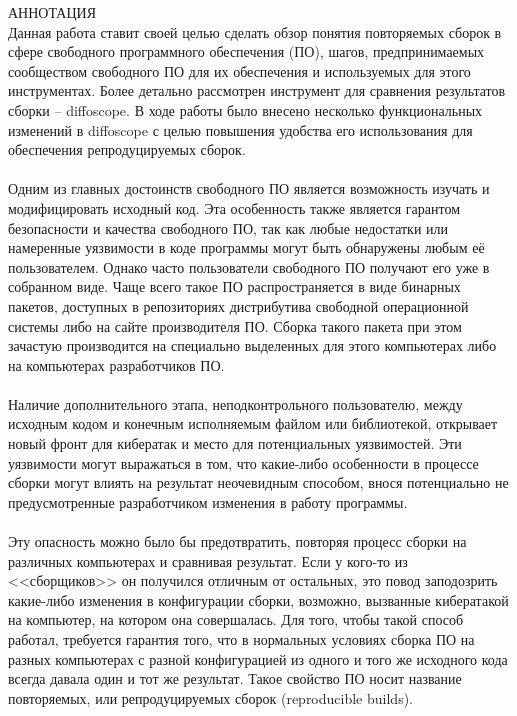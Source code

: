 {\centering
%
\SuperFont\MakeTextUppercase{Аннотация}\\
}
\vspace{32pt}
Данная работа ставит своей целью сделать обзор понятия повторяемых сборок в сфере свободного программного обеспечения (ПО), шагов, предпринимаемых сообществом свободного ПО для их обеспечения и используемых для этого инструментах. Более детально рассмотрен инструмент для сравнения результатов сборки -- diffoscope. В ходе работы было внесено несколько функциональных изменений в diffoscope с целью повышения удобства его использования для обеспечения репродуцируемых сборок.\\\\
Одним из главных достоинств свободного ПО является возможность изучать и модифицировать исходный код. Эта особенность также является гарантом безопасности и качества свободного ПО, так как любые недостатки или намеренные уязвимости в коде программы могут быть обнаружены любым её пользователем. Однако часто пользователи свободного ПО получают его уже в собранном виде. Чаще всего такое ПО распространяется в виде бинарных пакетов, доступных в репозиториях дистрибутива свободной операционной системы либо на сайте производителя ПО. Сборка такого пакета при этом зачастую производится на специально выделенных для этого компьютерах либо на компьютерах разработчиков ПО.\\\\
Наличие дополнительного этапа, неподконтрольного пользователю, между исходным кодом и конечным исполняемым файлом или библиотекой, открывает новый фронт для кибератак и место для потенциальных уязвимостей. Эти уязвимости могут выражаться в том, что какие-либо особенности в процессе сборки могут влиять на результат неочевидным способом, внося потенциально не предусмотренные разработчиком изменения в работу программы.\\\\
Эту опасность можно было бы предотвратить, повторяя процесс сборки на различных компьютерах и сравнивая результат. Если у кого-то из <<сборщиков>> он получился отличным от остальных, это повод заподозрить какие-либо изменения в конфигурации сборки, возможно, вызванные кибератакой на компьютер, на котором она совершалась. Для того, чтобы такой способ работал, требуется гарантия того, что в нормальных условиях сборка ПО на разных компьютерах с разной конфигурацией из одного и того же исходного кода всегда давала один и тот же результат. Такое свойство ПО носит название повторяемых, или репродуцируемых сборок (reproducible builds).\\\\
